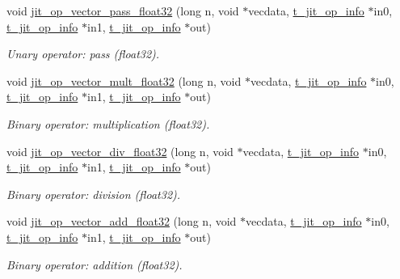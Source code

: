 \begin{DoxyCompactItemize}
void \hyperlink{group__opvecmod_ga6afcf9e93db2e15454448ce58a1c6217}{jit\_\-op\_\-vector\_\-pass\_\-float32} (long n, void $\ast$vecdata, \hyperlink{structt__jit__op__info}{t\_\-jit\_\-op\_\-info} $\ast$in0, \hyperlink{structt__jit__op__info}{t\_\-jit\_\-op\_\-info} $\ast$in1, \hyperlink{structt__jit__op__info}{t\_\-jit\_\-op\_\-info} $\ast$out)
\begin{DoxyCompactList}\small\item\em Unary operator: pass (float32). \item\end{DoxyCompactList}\item 
void \hyperlink{group__opvecmod_gad0a57e536071468ec58cf85c95ece970}{jit\_\-op\_\-vector\_\-mult\_\-float32} (long n, void $\ast$vecdata, \hyperlink{structt__jit__op__info}{t\_\-jit\_\-op\_\-info} $\ast$in0, \hyperlink{structt__jit__op__info}{t\_\-jit\_\-op\_\-info} $\ast$in1, \hyperlink{structt__jit__op__info}{t\_\-jit\_\-op\_\-info} $\ast$out)
\begin{DoxyCompactList}\small\item\em Binary operator: multiplication (float32). \item\end{DoxyCompactList}\item 
void \hyperlink{group__opvecmod_ga5519709ea63d802d96aef03267e2361e}{jit\_\-op\_\-vector\_\-div\_\-float32} (long n, void $\ast$vecdata, \hyperlink{structt__jit__op__info}{t\_\-jit\_\-op\_\-info} $\ast$in0, \hyperlink{structt__jit__op__info}{t\_\-jit\_\-op\_\-info} $\ast$in1, \hyperlink{structt__jit__op__info}{t\_\-jit\_\-op\_\-info} $\ast$out)
\begin{DoxyCompactList}\small\item\em Binary operator: division (float32). \item\end{DoxyCompactList}\item 
void \hyperlink{group__opvecmod_ga30cfcfb6333f08dda447d2ce64fe0326}{jit\_\-op\_\-vector\_\-add\_\-float32} (long n, void $\ast$vecdata, \hyperlink{structt__jit__op__info}{t\_\-jit\_\-op\_\-info} $\ast$in0, \hyperlink{structt__jit__op__info}{t\_\-jit\_\-op\_\-info} $\ast$in1, \hyperlink{structt__jit__op__info}{t\_\-jit\_\-op\_\-info} $\ast$out)
\begin{DoxyCompactList}\small\item\em Binary operator: addition (float32). \item\end{DoxyCompactList}\item 

\end{DoxyCompactItemize}

